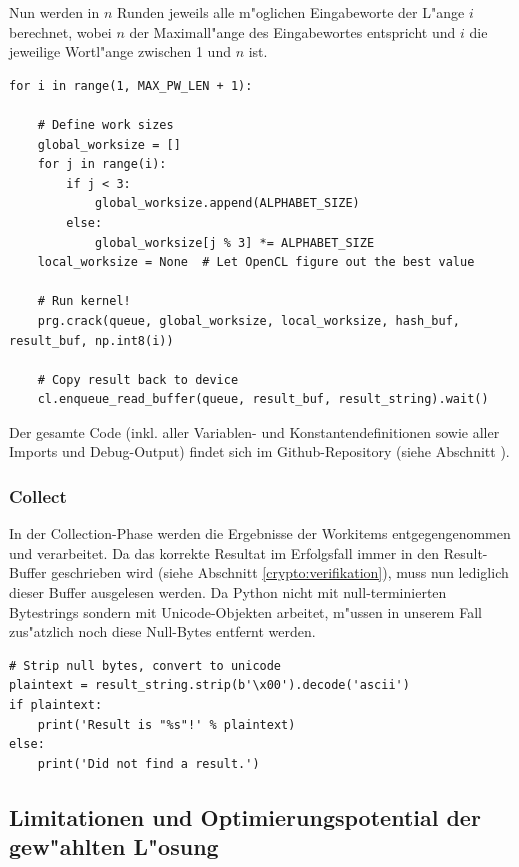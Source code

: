 \begin{refsection}
\noindent Nun werden in $n$ Runden jeweils alle m"oglichen Eingabeworte der
L"ange $i$ berechnet, wobei $n$ der Maximall"ange des Eingabewortes entspricht
und $i$ die jeweilige Wortl"ange zwischen 1 und $n$ ist.

\begin{small}
\begin{verbatim}
for i in range(1, MAX_PW_LEN + 1):

    # Define work sizes
    global_worksize = []
    for j in range(i):
        if j < 3:
            global_worksize.append(ALPHABET_SIZE)
        else:
            global_worksize[j % 3] *= ALPHABET_SIZE
    local_worksize = None  # Let OpenCL figure out the best value

    # Run kernel!
    prg.crack(queue, global_worksize, local_worksize, hash_buf, result_buf, np.int8(i))

    # Copy result back to device
    cl.enqueue_read_buffer(queue, result_buf, result_string).wait()
\end{verbatim}
\end{small}

\noindent Der gesamte Code (inkl. aller Variablen- und Konstantendefinitionen
sowie aller Imports und Debug-Output) findet sich im Github-Repository (siehe
Abschnitt \cite{crypto:resultate:links}).

\subsubsection{Collect}

In der Collection-Phase werden die Ergebnisse der Workitems entgegengenommen und
verarbeitet. Da das korrekte Resultat im Erfolgsfall immer in den Result-Buffer
geschrieben wird (siehe Abschnitt \ref{crypto:verifikation}), muss nun lediglich
dieser Buffer ausgelesen werden. Da Python nicht mit null-terminierten
Bytestrings sondern mit Unicode-Objekten arbeitet, m"ussen in unserem Fall
zus"atzlich noch diese Null-Bytes entfernt werden.

\begin{small}
\begin{verbatim}
# Strip null bytes, convert to unicode
plaintext = result_string.strip(b'\x00').decode('ascii')
if plaintext:
    print('Result is "%s"!' % plaintext)
else:
    print('Did not find a result.')
\end{verbatim}
\end{small}


\subsection{Limitationen und Optimierungspotential der gew"ahlten L"osung}


\end{refsection}

